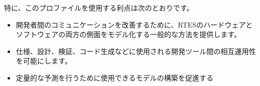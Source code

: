 特に、このプロファイルを使用する利点は次のとおりです。
\begin{itemize}
  \item  開発者間のコミュニケーションを改善するために、RTESのハードウェアとソフトウェアの両方の側面をモデル化する一般的な方法を提供します。
  \item  仕様、設計、検証、コード生成などに使用される開発ツール間の相互運用性を可能にします。
  \item  定量的な予測を行うために使用できるモデルの構築を促進する
\end{itemize}
